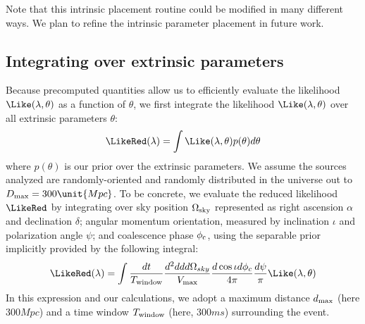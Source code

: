 Note that this intrinsic placement routine could be modified in many different ways. 
We plan to refine the intrinsic parameter placement in future work.





\subsection{Integrating over extrinsic parameters}
\label{subsec:extrinsic}

Because precomputed quantities allow us to efficiently evaluate the likelihood $\Like(\lambda,\theta)$ as a function of
$\theta$, we first integrate the likelihood $\Like(\lambda,\theta)$ over all extrinsic parameters $\theta$:
\begin{eqnarray}
\LikeRed(\lambda) = \int \Like(\lambda,\theta) p(\theta) d\theta
\end{eqnarray}
where $p(\theta)$ is our prior over the extrinsic  parameters.  We assume the sources analyzed are randomly-oriented and
randomly distributed in the universe out to $D_{\rm max}=300 \unit{Mpc}$.  
To be concrete, we evaluate the reduced likelihood $\LikeRed$ by integrating over sky position $\Omega_{\rm sky}$ represented
as right ascension $\alpha$ and declination $\delta$; angular momentum orientation, measured by inclination $\iota$ and
polarization angle $\psi$;  and coalescence phase $\phi_{\rm c}$, using the separable prior implicitly provided by the
following integral:
\begin{eqnarray}
\LikeRed(\lambda) = \int \frac{dt}{T_{\rm window}} \frac{d^2 dd d\Omega_{sky} }{V_{\rm max}} \frac{d \cos \iota d\phi_c}{4\pi} \frac{d\psi}{\pi} \Like(\lambda,\theta)
\end{eqnarray}
%
In this expression and our calculations, we adopt a maximum distance $d_{\rm max}$ (here $300 \unit{Mpc}$) and a time window
$ T_{\rm window}$  (here, $300\unit{ms}$)  surrounding the event.  

